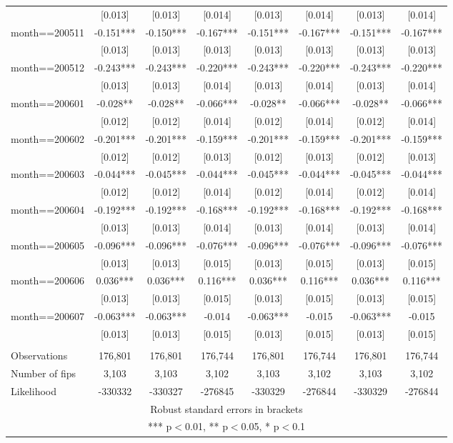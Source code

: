 \documentclass[]{article}
\begin{document}
\begin{tabular}{lccccccc}
 & [0.013] & [0.013] & [0.014] & [0.013] & [0.014] & [0.013] & [0.014] \\
month==200511 & -0.151*** & -0.150*** & -0.167*** & -0.151*** & -0.167*** & -0.151*** & -0.167*** \\
 & [0.013] & [0.013] & [0.013] & [0.013] & [0.013] & [0.013] & [0.013] \\
month==200512 & -0.243*** & -0.243*** & -0.220*** & -0.243*** & -0.220*** & -0.243*** & -0.220*** \\
 & [0.013] & [0.013] & [0.014] & [0.013] & [0.014] & [0.013] & [0.014] \\
month==200601 & -0.028** & -0.028** & -0.066*** & -0.028** & -0.066*** & -0.028** & -0.066*** \\
 & [0.012] & [0.012] & [0.014] & [0.012] & [0.014] & [0.012] & [0.014] \\
month==200602 & -0.201*** & -0.201*** & -0.159*** & -0.201*** & -0.159*** & -0.201*** & -0.159*** \\
 & [0.012] & [0.012] & [0.013] & [0.012] & [0.013] & [0.012] & [0.013] \\
month==200603 & -0.044*** & -0.045*** & -0.044*** & -0.045*** & -0.044*** & -0.045*** & -0.044*** \\
 & [0.012] & [0.012] & [0.014] & [0.012] & [0.014] & [0.012] & [0.014] \\
month==200604 & -0.192*** & -0.192*** & -0.168*** & -0.192*** & -0.168*** & -0.192*** & -0.168*** \\
 & [0.013] & [0.013] & [0.014] & [0.013] & [0.014] & [0.013] & [0.014] \\
month==200605 & -0.096*** & -0.096*** & -0.076*** & -0.096*** & -0.076*** & -0.096*** & -0.076*** \\
 & [0.013] & [0.013] & [0.015] & [0.013] & [0.015] & [0.013] & [0.015] \\
month==200606 & 0.036*** & 0.036*** & 0.116*** & 0.036*** & 0.116*** & 0.036*** & 0.116*** \\
 & [0.013] & [0.013] & [0.015] & [0.013] & [0.015] & [0.013] & [0.015] \\
month==200607 & -0.063*** & -0.063*** & -0.014 & -0.063*** & -0.015 & -0.063*** & -0.015 \\
 & [0.013] & [0.013] & [0.015] & [0.013] & [0.015] & [0.013] & [0.015] \\
 &  &  &  &  &  &  &  \\
Observations & 176,801 & 176,801 & 176,744 & 176,801 & 176,744 & 176,801 & 176,744 \\
Number of fips & 3,103 & 3,103 & 3,102 & 3,103 & 3,102 & 3,103 & 3,102 \\
 Likelihood & -330332 & -330327 & -276845 & -330329 & -276844 & -330329 & -276844 \\ \hline
\multicolumn{8}{c}{ Robust standard errors in brackets} \\
\multicolumn{8}{c}{ *** p$<$0.01, ** p$<$0.05, * p$<$0.1} \\
\end{tabular}
\end{document}
